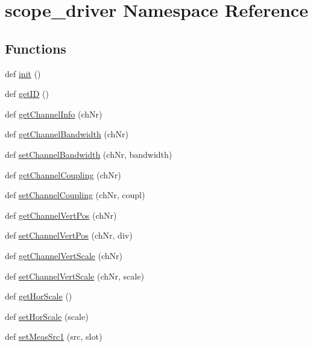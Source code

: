 \hypertarget{namespacescope__driver}{}\section{scope\+\_\+driver Namespace Reference}
\label{namespacescope__driver}
\subsection*{Functions}
\begin{DoxyCompactItemize}
\item 
def \hyperlink{namespacescope__driver_a7dff97e7a734c83b05f8765413706e11}{init} ()
\item 
def \hyperlink{namespacescope__driver_a89ba1842eabba389121069eefc856271}{get\+ID} ()
\item 
def \hyperlink{namespacescope__driver_aaba7e69130aab5e96c11cce82a4b50a8}{get\+Channel\+Info} (ch\+Nr)
\item 
def \hyperlink{namespacescope__driver_abaaffe8208b3e65a883429b67db3efb2}{get\+Channel\+Bandwidth} (ch\+Nr)
\item 
def \hyperlink{namespacescope__driver_a372ba6fbecc6901d912839bc234a4150}{set\+Channel\+Bandwidth} (ch\+Nr, bandwidth)
\item 
def \hyperlink{namespacescope__driver_a64d5e53c06b715ca0502076d419552e2}{get\+Channel\+Coupling} (ch\+Nr)
\item 
def \hyperlink{namespacescope__driver_adf5686f08f00e219e3135dfc617b2af8}{set\+Channel\+Coupling} (ch\+Nr, coupl)
\item 
def \hyperlink{namespacescope__driver_a3015b914ca2cd61b10e0ef00267dbb5c}{get\+Channel\+Vert\+Pos} (ch\+Nr)
\item 
def \hyperlink{namespacescope__driver_a472b2408b8b9825c9cfbcb8438817306}{set\+Channel\+Vert\+Pos} (ch\+Nr, div)
\item 
def \hyperlink{namespacescope__driver_adbdbb48ea81dbe1c65192cf395408853}{get\+Channel\+Vert\+Scale} (ch\+Nr)
\item 
def \hyperlink{namespacescope__driver_a92103c5941e85daf979f2902c78999da}{set\+Channel\+Vert\+Scale} (ch\+Nr, scale)
\item 
def \hyperlink{namespacescope__driver_aca0699f139892ac173d2ce51bdacfaae}{get\+Hor\+Scale} ()
\item 
def \hyperlink{namespacescope__driver_a91febfe7ca6663a9ddb2c384f995582d}{set\+Hor\+Scale} (scale)
\item 
def \hyperlink{namespacescope__driver_a3ae93dd45c46cedd0e4cfca50ac4702a}{set\+Meas\+Src1} (src, slot)

\end{DoxyCompactItemize}
